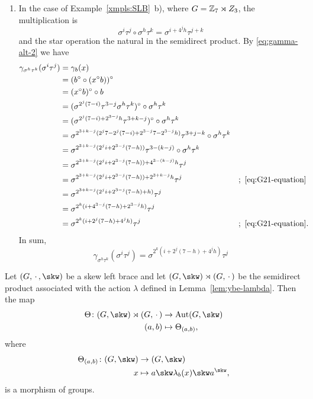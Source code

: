 \begin{xmpls}
\begin{enumerate}[\rm a)]
        \item In the case of Example~\ref{xmpls:SLB}~b), where $G=\mathbb{Z}_7\rtimes Z_3$, the multiplication is
        $$
            \sigma^i\tau^j\circ\sigma^h\tau^k=\sigma^{i+4^jh}\tau^{j+k}
        $$
        and the star operation the natural in the semidirect product. By \eqref{eq:gamma-alt-2} we have
        \begin{align*}
        \gamma_{\sigma^h\tau^k}(\sigma^i\tau^j)
            &= \gamma_b(x)\\
            &= (b^\circ\circ(x^\circ b))^\circ\\
            &= (x^\circ b)^\circ\circ b\\
            &= (\sigma^{2^j(7-i)}\tau^{3-j}\sigma^h\tau^k)^\circ
                \circ\sigma^h\tau^k\\
            &= (\sigma^{2^j(7-i)+2^{3-j}h}\tau^{3+k-j})^\circ
                \circ\sigma^h\tau^k\\
            &= \sigma^{2^{3+k-j}(2^j7-2^j(7-i)+ 2^{3-j}7-2^{3-j}h)}
                \tau^{3+j-k}\circ\sigma^h\tau^k\\
            &= \sigma^{2^{3+k-j}(2^ji+2^{3-j}(7-h))}
                \tau^{3-(k-j)}\circ\sigma^h\tau^k\\
            &= \sigma^{2^{3+k-j}(2^ji+2^{3-j}(7-h))+4^{3-(k-j)}h}\tau^j\\
            &= \sigma^{2^{3+k-j}(2^ji+2^{3-j}(7-h))+2^{3+k-j}h}\tau^j
                &&;\ \eqref{eq:G21-equation}\\
            &= \sigma^{2^{3+k-j}(2^ji+2^{3-j}(7-h)+h)}\tau^j\\
            &= \sigma^{2^k(i+4^{3-j}(7-h)+2^{3-j}h)}\tau^j\\
            &= \sigma^{2^k(i+2^j(7-h)+4^jh)}\tau^j
                &&;\ \eqref{eq:G21-equation}.
    \end{align*}
    In sum,
    \begin{equation}\label{eq:gamma-21}
        \gamma_{\sigma^h\tau^k}(\sigma^i\tau^j)
            = \sigma^{2^k(i+2^j(7-h)+4^jh)}\tau^j
    \end{equation}
\end{enumerate}
\end{xmpls}

\begin{lem}\label{lem:ybe-theta}
    Let\/ $(G,\,\cdot\,,\skw)$ be a skew left brace and let\/ $(G,\skw)\rtimes(G,\,\cdot\,)$ be the semidirect product associated with the action\/ $\lambda$ defined in \textrm{\rm Lemma~\ref{lem:ybe-lambda}}. Then the map
    \begin{align*}
        \Theta\colon(G,\skw)\rtimes(G,\,\cdot\,)&\to\Aut(G,\skw)\\
        (a,b)&\mapsto\Theta_{(a,b)},
    \end{align*}
    where
    \begin{align*}
        \Theta_{(a,b)}\colon(G,\skw)&\to(G,\skw)\\
        x&\mapsto a\skw\lambda_b(x)\skw a^\skw,
    \end{align*}
    is a morphism of groups.
\end{lem}

